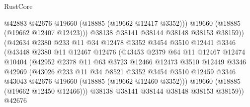 \begin{lexlean}{RustCore}
\begin{coremodule}
                                @42883
                                @42676
                                @19660
                                (@18885 (@19662 @12417 @3352)))
                              @19660
                              (@18885 (@19662 @12407 @12423)))
                            @38138
                            @38141
                            @38144
                            @38148
                            @38153
                            @38159))
                        (@42634
                          @2380
                          @233
                          @11
                          @34
                          @12478
                          @3352
                          @3454
                          @3510
                          @12441
                          @3346
                          (@43448
                            @2380
                            @11
                            @12467
                            @12476
                            (@43453
                              @2379
                              @64
                              @11
                              @12467
                              @12474
                              @10404
                              (@42952
                                @2378
                                @11
                                @63
                                @3723
                                @12466
                                @12473
                                @3510
                                @12449
                                @3346
                                @42969
                                (@43026
                                  @233
                                  @11
                                  @34
                                  @8521
                                  @3352
                                  @3454
                                  @3510
                                  @12459
                                  @3346
                                  @43043
                                  @42676
                                  @19660
                                  (@18885 (@19662 @12460 @3352)))
                                @19660
                                (@18885 (@19662 @12450 @12466)))
                              @38138
                              @38141
                              @38144
                              @38148
                              @38153
                              @38159))
                          @42676

\end{coremodule}
\end{lexlean}
